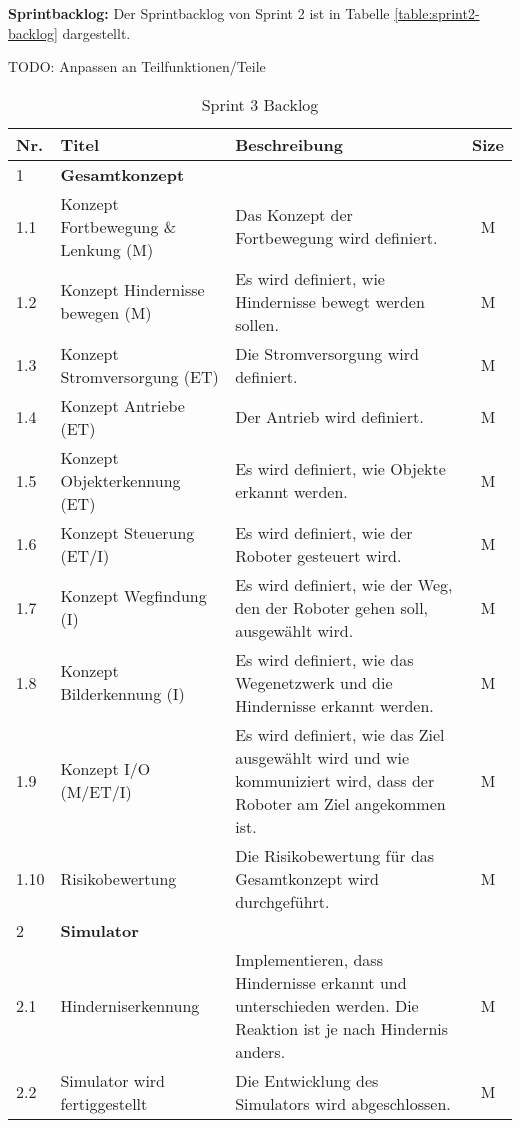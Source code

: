 \textbf{Sprintbacklog:} Der Sprintbacklog von Sprint 2 ist in Tabelle \ref{table:sprint2-backlog} dargestellt.

TODO: Anpassen an Teilfunktionen/Teile

\begin{table}[H]
\centering
\small
\begin{tabularx}{\textwidth}{|l|l|X|c|}
\hline
  \textbf{Nr.} & \textbf{Titel} & \textbf{Beschreibung} & \textbf{Size}\\
  \hline
  1  & \textbf{Gesamtkonzept} &&\\
  \hline
  1.1  & Konzept Fortbewegung \& Lenkung (M) &  Das Konzept der Fortbewegung wird definiert. & M\\
  \hline
  1.2 & Konzept Hindernisse bewegen (M) & Es wird definiert, wie Hindernisse bewegt werden sollen. & M\\
  \hline
  1.3 & Konzept Stromversorgung (ET) & Die Stromversorgung wird definiert. & M\\
  \hline
  1.4 & Konzept Antriebe (ET) & Der Antrieb wird definiert. & M\\
  \hline
  1.5 & Konzept Objekterkennung (ET) & Es wird definiert, wie Objekte erkannt werden. & M\\
  \hline
  1.6 & Konzept Steuerung (ET/I) & Es wird definiert, wie der Roboter gesteuert wird. & M\\
  \hline
    1.7 & Konzept Wegfindung (I) & Es wird definiert, wie der Weg, den der Roboter gehen soll, ausgewählt wird.  & M\\
\hline
    1.8 & Konzept Bilderkennung (I) & Es wird definiert, wie das Wegenetzwerk und die Hindernisse erkannt werden. & M\\
\hline
    1.9 & Konzept I/O (M/ET/I) & Es wird definiert, wie das Ziel ausgewählt wird und wie kommuniziert wird, dass der Roboter am Ziel angekommen ist. & M\\
\hline
  1.10  & Risikobewertung & Die Risikobewertung für das Gesamtkonzept wird durchgeführt. & M \\
  \hline 
  2  & \textbf{Simulator} &&\\
  \hline
    2.1 & Hinderniserkennung & Implementieren, dass Hindernisse erkannt und unterschieden werden. Die Reaktion ist je nach Hindernis anders.& M \\
    \hline
  2.2 & Simulator wird fertiggestellt &  Die Entwicklung des Simulators wird abgeschlossen. & M\\
  \hline
  
\end{tabularx}
\caption{Sprint 3 Backlog}
\label{table:sprint3-backlog}
\end{table}

